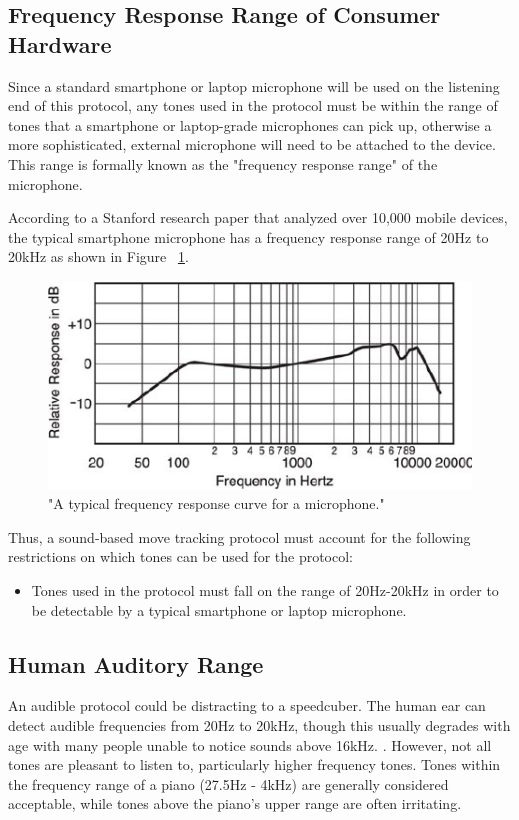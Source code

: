 \subsection{Frequency Response Range of Consumer Hardware}
\label{subsec:frequency-response-range}
Since a standard smartphone or laptop microphone will be used on the listening end of this protocol, any tones used in the protocol must be within the range of tones that a smartphone or laptop-grade microphones can pick up, otherwise a more sophisticated, external microphone will need to be attached to the device.
This range is formally known as the "frequency response range" of the microphone.

According to a Stanford research paper \cite{typical-mic-range} that analyzed over 10,000 mobile devices, the typical smartphone microphone has a frequency response range of 20Hz to 20kHz as shown in Figure ~\ref{fig:freq-res-range}.

\begin{figure}[h]
    \centering
    \caption{"A typical frequency response curve for a microphone." \cite{typical-mic-range}}
    \label{fig:freq-res-range}
    \includegraphics[width=.50\linewidth]{Figures/4 Protocol Design/Frequency Response Range/typical-smartphone-response-range.png}
\end{figure}

Thus, a sound-based move tracking protocol must account for the following restrictions on which tones can be used for the protocol:
\begin{itemize}
    \item Tones used in the protocol must fall on the range of 20Hz-20kHz in order to be detectable by a typical smartphone or laptop microphone.
\end{itemize}

\subsection{Human Auditory Range}
\label{subsec:human-auditory-range}
An audible protocol could be distracting to a speedcuber. 
The human ear can detect audible frequencies from 20Hz to 20kHz, though this usually degrades with age with many people unable to notice sounds above 16kHz. \cite{audible-range}.
However, not all tones are pleasant to listen to, particularly higher frequency tones.
Tones within the frequency range of a piano (27.5Hz - 4kHz) are generally considered acceptable, while tones above the piano's upper range are often irritating. \cite{piano-range}

